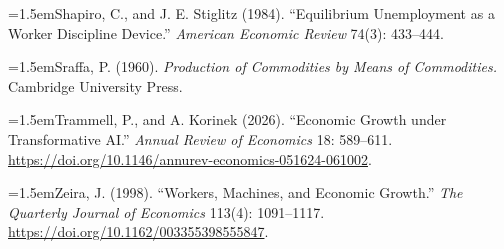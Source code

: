 \documentclass[12pt]{article}
\theoremstyle{plain}
\theoremstyle{definition}
\theoremstyle{remark}
\newcommand{\refentry}[1]{\par\hangindent=1.5em\hangafter=1\noindent #1}
\begin{document}
{\refentry{Shapiro, C., and J. E. Stiglitz (1984). ``Equilibrium Unemployment as a Worker Discipline Device.'' \emph{American Economic Review} 74(3): 433--444.}
\refentry{Sraffa, P. (1960). \emph{Production of Commodities by Means of Commodities.} Cambridge University Press.}
\refentry{Trammell, P., and A. Korinek (2026). ``Economic Growth under Transformative AI.'' \emph{Annual Review of Economics} 18: 589--611. \url{https://doi.org/10.1146/annurev-economics-051624-061002}.}
\refentry{Zeira, J. (1998). ``Workers, Machines, and Economic Growth.'' \emph{The Quarterly Journal of Economics} 113(4): 1091--1117. \url{https://doi.org/10.1162/003355398555847}.}\par
}

\end{document}
